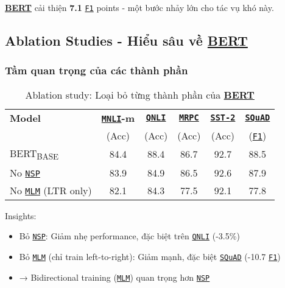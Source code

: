 \hyperref[acro:bert]{\textbf{BERT}} cải thiện \textbf{7.1} \hyperref[acro:f1]{\texttt{F1}} points - một bước nhảy lớn cho tác vụ khó này.
\subsection{Ablation Studies - Hiểu sâu về \hyperref[acro:bert]{\textbf{BERT}}}
\label{ssec:ablation_study}

\subsubsection{Tầm quan trọng của các thành phần}
\begin{table}[H]
    \centering
    \caption{Ablation study: Loại bỏ từng thành phần của \hyperref[acro:bert]{\textbf{BERT}}}
    \label{tab:ablation_components}
    \begin{tabular}{lccccc}
        \toprule
        \textbf{Model} & \textbf{\hyperref[acro:mnli]{\texttt{MNLI}}-m} & \textbf{\hyperref[acro:qnli]{\texttt{QNLI}}} & \textbf{\hyperref[acro:mrpc]{\texttt{MRPC}}} & \textbf{\hyperref[acro:sst2]{\texttt{SST-2}}} & \textbf{\hyperref[acro:squad]{\texttt{SQuAD}}} \\
        & (Acc) & (Acc) & (Acc) & (Acc) & (\hyperref[acro:f1]{\texttt{F1}}) \\
        \midrule
        BERT\textsubscript{BASE} & 84.4
        & 88.4 & 86.7 & 92.7 & 88.5 \\
        \midrule
        No \hyperref[acro:nsp]{\texttt{NSP}} & 83.9 & 84.9 & 86.5 & 92.6 & 87.9 \\
        No \hyperref[acro:mlm]{\texttt{MLM}} (LTR only) & 82.1 & 84.3 & 77.5 & 92.1 & 77.8 \\
        \bottomrule
    \end{tabular}
\end{table}

Insights:
\begin{itemize}
    \item Bỏ \hyperref[acro:nsp]{\texttt{NSP}}: Giảm nhẹ performance, đặc biệt trên \hyperref[acro:qnli]{\texttt{QNLI}} (-3.5\%)
    \item Bỏ \hyperref[acro:mlm]{\texttt{MLM}} (chỉ train left-to-right): Giảm mạnh, đặc biệt \hyperref[acro:squad]{\texttt{SQuAD}} (-10.7
    \hyperref[acro:f1]{\texttt{F1}})
    \item → Bidirectional training (\hyperref[acro:mlm]{\texttt{MLM}}) quan trọng hơn \hyperref[acro:nsp]{\texttt{NSP}}
\end{itemize}

